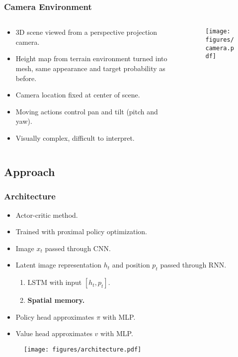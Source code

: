 \begin{frame}
    \frametitle{Camera Environment}
    \begin{columns}
        \begin{column}{0.5\textwidth}
            \begin{itemize}
                \item 3D scene viewed from a perspective projection camera.
                \item Height map from terrain environment turned into mesh, same appearance and target probability as before.
                \item Camera location fixed at center of scene.
                \item Moving actions control pan and tilt (pitch and yaw).
                \item Visually complex, difficult to interpret.
            \end{itemize}
        \end{column}
        \begin{column}{0.5\textwidth}
            \begin{figure}
                \centering
                \texttt{[image: figures/camera.pdf]}
            \end{figure}
        \end{column}
    \end{columns}
\end{frame}

\subsection{Approach}

\begin{frame}
    \frametitle{Architecture}

    \begin{itemize}
        \item Actor-critic method.
        \item Trained with proximal policy optimization.
        \item Image \(x_t\) passed through CNN.
        \item Latent image representation \(h_t\) and position \(p_t\) passed through RNN.
        \begin{enumerate}
            \item LSTM with input \(\left\lbrack h_t, p_t \right\rbrack\).
            \item \textbf{Spatial memory.}
        \end{enumerate}
        \item Policy head approximates \(\pi\) with MLP.
        \item Value head approximates \(v\) with MLP.
    \end{itemize}

    \begin{figure}
        \centering
        \texttt{[image: figures/architecture.pdf]}
    \end{figure}
\end{frame}

